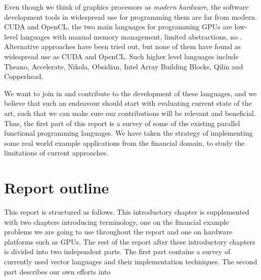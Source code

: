 Even though we think of graphics processors as \textit{modern
  hardware}, the software development tools in widespread use for
programming them are far from modern. CUDA and OpenCL, the two main
languages for programming GPUs are low-level languages with manual
memory management, limited abstractions, no . Alternative approaches have been tried out, but none of them
have found as widespread use as CUDA and OpenCL. Such higher level
languages include Theano, Accelerate, Nikola, Obsidian, Intel Array
Building Blocks, Qilin and Copperhead.


We want to join in and contribute to the development of these
languages, and we believe that such an endeavour should start with
evaluating current state of the art, such that we can make sure our
contributions will be relevant and beneficial. Thus, the first part of
this report is a survey of some of the existing parallel functional
programming languages. We have taken the strategy of implementing some
real world example applications from the financial domain, to study
the limitations of current approaches.


\section{Report outline}
This report is structured as follows. This introductory chapter is
supplemented with two chapters introducing terminology, one on the
financial example problems we are going to use throughout the report
and one on hardware platforms such as GPUs. The rest of the report
after these introductory chapters is divided into two independent
parts. The first part contains a survey of currently used vector
languages and their implementation techniques. The second part
describes our own efforts into \todo{\ldots}

